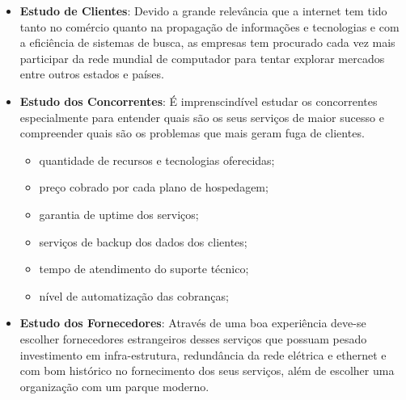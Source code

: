 \documentclass[12pt]{article}
\begin{document}
\begin{itemize}

	\item \textbf{Estudo de Clientes}: Devido a grande relevância que a internet tem tido tanto no comércio quanto na propagação de informações e tecnologias e com a eficiência de sistemas de busca, as empresas tem procurado cada vez mais participar da rede mundial de computador para tentar explorar mercados entre outros estados e países.

	\item \textbf{Estudo dos Concorrentes}: É imprenscindível estudar os concorrentes especialmente para entender quais são os seus serviços de maior sucesso e compreender quais são os problemas que mais geram fuga de clientes.

	\begin{itemize}

		\item quantidade de recursos e tecnologias oferecidas;
		\item preço cobrado por cada plano de hospedagem;
		\item garantia de uptime dos serviços;
		\item serviços de backup dos dados dos clientes;
		\item tempo de atendimento do suporte técnico;
		\item nível de automatização das cobranças;

	\end{itemize}

	\item \textbf{Estudo dos Fornecedores}: Através de uma boa experiência deve-se escolher fornecedores estrangeiros desses serviços que possuam pesado investimento em infra-estrutura, redundância da rede elétrica e ethernet e com bom histórico no fornecimento dos seus serviços, além de escolher uma organização com um parque moderno.

\end{itemize}
\end{document}
